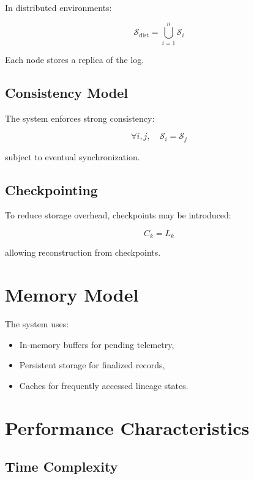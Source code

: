 In distributed environments:

\begin{equation}
\mathcal{S}_{\text{dist}} = \bigcup_{i=1}^{n} \mathcal{S}_i
\end{equation}

Each node stores a replica of the log.

\subsection{Consistency Model}

The system enforces strong consistency:

\begin{equation}
\forall i,j, \quad \mathcal{S}_i = \mathcal{S}_j
\end{equation}

subject to eventual synchronization.

\subsection{Checkpointing}

To reduce storage overhead, checkpoints may be introduced:

\begin{equation}
C_k = L_k
\end{equation}

allowing reconstruction from checkpoints.

\section{Memory Model}

The system uses:

\begin{itemize}
\item In-memory buffers for pending telemetry,
\item Persistent storage for finalized records,
\item Caches for frequently accessed lineage states.
\end{itemize}

\section{Performance Characteristics}

\subsection{Time Complexity}

